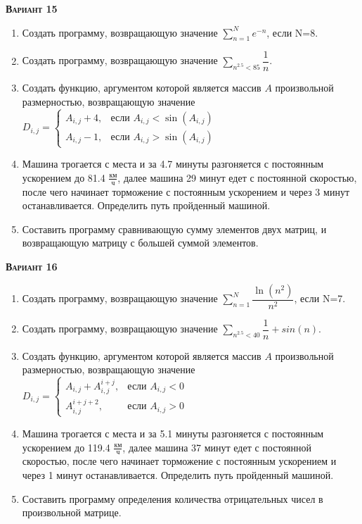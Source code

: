 \textsc{\textbf{Вариант 15}}
\begin{enumerate}
\item  Создать программу, возвращающую значение $\sum\limits_{n=1}^{N} {e^{-n}}                      $, если N=8. 
\item  Создать программу, возвращающую значение $\sum\limits_{n^{2.5}<  85} {\dfrac{1}{n} }               $. 
\item Создать функцию, аргументом которой является массив $A$ произвольной размерностью, возвращающую значение $D_{i,j}=\begin{cases} A_{i,j}+4, & \text{если } {A_{i,j}}<\sin(A_{i,j}) \\  A_{i,j}-1, & \text{если } {A_{i,j}}>\sin(A_{i,j}) \end{cases}    $ 
\item Машина трогается с места и за  4.7 минуты разгоняется с постоянным ускорением до 81.4 ${\frac{км}{ч}}$, далее машина   29 минут едет с постоянной скоростью, после чего начинает торможение с постоянным ускорением и через   3 минут останавливается. Определить путь пройденный машиной.  \item Составить программу сравнивающую сумму элементов двух матриц, и возвращающую матрицу с большей суммой элементов.                                                                                                                                      

\end{enumerate}
\textsc{\textbf{Вариант 16}}
\begin{enumerate}
\item  Создать программу, возвращающую значение $\sum\limits_{n=1}^{N} \dfrac{\ln(n^2)}{n^2}         $, если N=7. 
\item  Создать программу, возвращающую значение $\sum\limits_{n^{2.5}<  40} {\dfrac{1}{n} +sin(n)}        $. 
\item Создать функцию, аргументом которой является массив $A$ произвольной размерностью, возвращающую значение $D_{i,j}=\begin{cases} A_{i,j}+A_{i,j}^{i+j}, & \text{если } {A_{i,j}}<0 \\  A_{i,j}^{i+j+2}, & \text{если } {A_{i,j}}>0 \end{cases}          $ 
\item Машина трогается с места и за  5.1 минуты разгоняется с постоянным ускорением до 119.4 ${\frac{км}{ч}}$, далее машина   37 минут едет с постоянной скоростью, после чего начинает торможение с постоянным ускорением и через   1 минут останавливается. Определить путь пройденный машиной.  \item Составить программу определения количества отрицательных чисел в произвольной матрице.                                                                                                                                                                                    

\end{enumerate}
